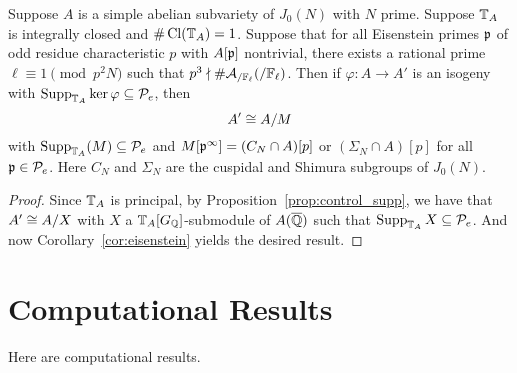 \documentclass[thesis.tex]{subfiles}
\begin{document}
\begin{theorem}%
    \label{thm:combine}
    Suppose $A$ is a simple abelian subvariety of $J_0(N)$ with $N$ prime.
    Suppose $\mathbb{T}_A$ is integrally closed and $\#\operatorname{Cl}(\mathbb{T}_A)=1$. Suppose that for
    all Eisenstein primes $\mathfrak{p}$ of odd residue characteristic $p$ with $A[\mathfrak{p}]$
    nontrivial, there exists a rational prime $\ell\equiv 1\pmod{p^2N}$ such
    that $p^3\nmid \#\mathcal{A}_{/\mathbb{F}_\ell}(/\mathbb{F}_\ell)$. Then if $\varphi:A\to
    A'$ is an isogeny with $\operatorname{Supp}_{\mathbb{T}_A} \ker\varphi\subseteq \mathcal{P}_e$, then
    \[
        A'\cong A/M
    \]
    with $\operatorname{Supp}_{\mathbb{T}_A}(M)\subseteq \mathcal{P}_e$ and $M[\mathfrak{p}^\infty]=(C_N\cap A)[p]$ or
    $(\Sigma_N\cap A)[p]$ for all $\mathfrak{p}\in \mathcal{P}_e$. Here $C_N$ and $\Sigma_N$ are
    the cuspidal and Shimura subgroups of $J_0(N)$.
\end{theorem}
\begin{proof}
    Since $\mathbb{T}_A$ is principal, by Proposition~\ref{prop:control_supp}, we have
    that $A'\cong A/X$ with $X$ a $\mathbb{T}_A[G_{\mathbb{Q}}]$-submodule of $A(\overline{\mathbb{Q}})$ such
    that $\operatorname{Supp}_{\mathbb{T}_A}X\subseteq \mathcal{P}_e$. And now Corollary~\ref{cor:eisenstein}
    yields the desired result.
\end{proof}

\section{Computational Results}

Here are computational results.


\end{document}
